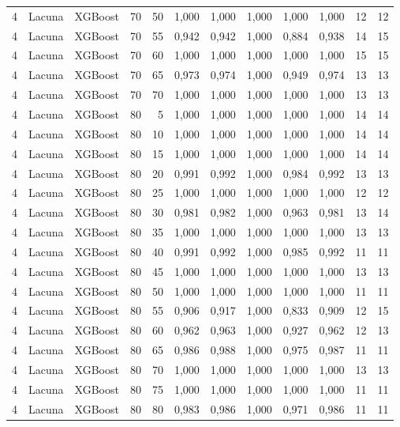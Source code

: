 \begin{longtable}{@{}rllrrrrrrrrr@{}}
4 & Lacuna & XGBoost & 70 & 50 & 1,000 & 1,000 & 1,000 & 1,000 & 1,000 & 12 & 12 \\
4 & Lacuna & XGBoost & 70 & 55 & 0,942 & 0,942 & 1,000 & 0,884 & 0,938 & 14 & 15 \\
4 & Lacuna & XGBoost & 70 & 60 & 1,000 & 1,000 & 1,000 & 1,000 & 1,000 & 15 & 15 \\
4 & Lacuna & XGBoost & 70 & 65 & 0,973 & 0,974 & 1,000 & 0,949 & 0,974 & 13 & 13 \\
4 & Lacuna & XGBoost & 70 & 70 & 1,000 & 1,000 & 1,000 & 1,000 & 1,000 & 13 & 13 \\
4 & Lacuna & XGBoost & 80 & 5 & 1,000 & 1,000 & 1,000 & 1,000 & 1,000 & 14 & 14 \\
4 & Lacuna & XGBoost & 80 & 10 & 1,000 & 1,000 & 1,000 & 1,000 & 1,000 & 14 & 14 \\
4 & Lacuna & XGBoost & 80 & 15 & 1,000 & 1,000 & 1,000 & 1,000 & 1,000 & 14 & 14 \\
4 & Lacuna & XGBoost & 80 & 20 & 0,991 & 0,992 & 1,000 & 0,984 & 0,992 & 13 & 13 \\
4 & Lacuna & XGBoost & 80 & 25 & 1,000 & 1,000 & 1,000 & 1,000 & 1,000 & 12 & 12 \\
4 & Lacuna & XGBoost & 80 & 30 & 0,981 & 0,982 & 1,000 & 0,963 & 0,981 & 13 & 14 \\
4 & Lacuna & XGBoost & 80 & 35 & 1,000 & 1,000 & 1,000 & 1,000 & 1,000 & 13 & 13 \\
4 & Lacuna & XGBoost & 80 & 40 & 0,991 & 0,992 & 1,000 & 0,985 & 0,992 & 11 & 11 \\
4 & Lacuna & XGBoost & 80 & 45 & 1,000 & 1,000 & 1,000 & 1,000 & 1,000 & 13 & 13 \\
4 & Lacuna & XGBoost & 80 & 50 & 1,000 & 1,000 & 1,000 & 1,000 & 1,000 & 11 & 11 \\
4 & Lacuna & XGBoost & 80 & 55 & 0,906 & 0,917 & 1,000 & 0,833 & 0,909 & 12 & 15 \\
4 & Lacuna & XGBoost & 80 & 60 & 0,962 & 0,963 & 1,000 & 0,927 & 0,962 & 12 & 13 \\
4 & Lacuna & XGBoost & 80 & 65 & 0,986 & 0,988 & 1,000 & 0,975 & 0,987 & 11 & 11 \\
4 & Lacuna & XGBoost & 80 & 70 & 1,000 & 1,000 & 1,000 & 1,000 & 1,000 & 13 & 13 \\
4 & Lacuna & XGBoost & 80 & 75 & 1,000 & 1,000 & 1,000 & 1,000 & 1,000 & 11 & 11 \\
4 & Lacuna & XGBoost & 80 & 80 & 0,983 & 0,986 & 1,000 & 0,971 & 0,986 & 11 & 11 \\

\end{longtable}
